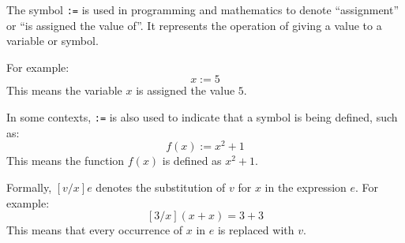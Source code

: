 




\begin{Def}[Symbol ``\texttt{:=}'']

    The symbol \texttt{:=} is used in programming and mathematics to denote ``assignment'' or ``is assigned the value of''. 
    It represents the operation of giving a value to a variable or symbol.

    \vspace{1em}
    \noindent
    For example:
    \[
    x := 5
    \]
    This means the variable $x$ is assigned the value $5$.

    \vspace{1em}
    \noindent
    In some contexts, \texttt{:=} is also used to indicate that a symbol is being defined, such as:
    \[
    f(x) := x^2 + 1
    \]
    This means the function $f(x)$ is defined as $x^2 + 1$.
\end{Def}

\begin{Def}
    
    \label{def:substitution}
    Formally, $[v/x]e$ denotes the substitution of $v$ for $x$ in the expression $e$.
    For example:
    \[
    [3/x](x + x) = 3 + 3
    \]
    This means that every occurrence of $x$ in $e$ is replaced with $v$.
\end{Def}



